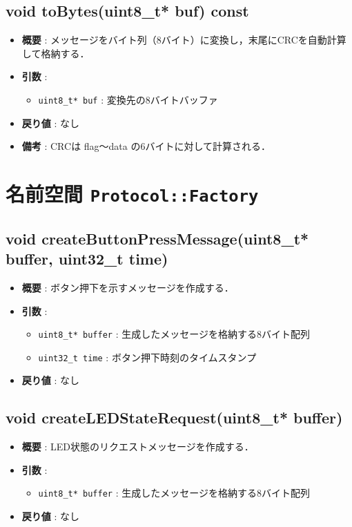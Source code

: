 \documentclass[a4paper,12pt]{article}
\begin{document}
\subsection{void toBytes(uint8\_t* buf) const}
\begin{itemize}
  \item \textbf{概要} : メッセージをバイト列（8バイト）に変換し，末尾にCRCを自動計算して格納する．
  \item \textbf{引数} :
  \begin{itemize}
    \item \texttt{uint8\_t* buf} : 変換先の8バイトバッファ
  \end{itemize}
  \item \textbf{戻り値} : なし
  \item \textbf{備考} : CRCは flag〜data の6バイトに対して計算される．
\end{itemize}

\section{名前空間 \texttt{Protocol::Factory}}

\subsection{void createButtonPressMessage(uint8\_t* buffer, uint32\_t time)}
\begin{itemize}
  \item \textbf{概要} : ボタン押下を示すメッセージを作成する．
  \item \textbf{引数} :
  \begin{itemize}
    \item \texttt{uint8\_t* buffer} : 生成したメッセージを格納する8バイト配列
    \item \texttt{uint32\_t time} : ボタン押下時刻のタイムスタンプ
  \end{itemize}
  \item \textbf{戻り値} : なし
\end{itemize}

\subsection{void createLEDStateRequest(uint8\_t* buffer)}
\begin{itemize}
  \item \textbf{概要} : LED状態のリクエストメッセージを作成する．
  \item \textbf{引数} :
  \begin{itemize}
    \item \texttt{uint8\_t* buffer} : 生成したメッセージを格納する8バイト配列
  \end{itemize}
  \item \textbf{戻り値} : なし
\end{itemize}
\end{document}
